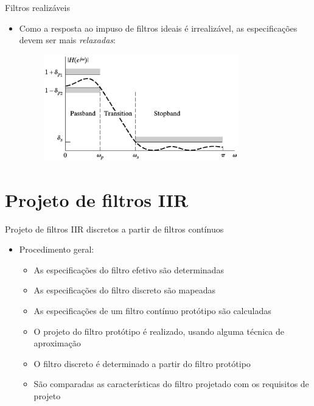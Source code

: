 %
%
\begin{slide}{Filtros realizáveis}
\begin{itemize}
   \item Como a resposta ao impuso de filtros ideais é irrealizável, as especificações devem ser mais \emph{relaxadas}:
   \begin{figure}
	   \centering
	   \includegraphics[width = 0.8\textwidth]{figs/specifications.eps}
   \end{figure}
\end{itemize}
\end{slide}

\section{Projeto de filtros IIR} 
\begin{slide}{Projeto de filtros IIR discretos a partir de filtros contínuos}
	\begin{itemize}
		\item Procedimento geral:
			\begin{itemize}
				\item As especificações do filtro efetivo são determinadas	
				\item As especificações do filtro discreto são mapeadas
				\item As especificações de um filtro contínuo protótipo são calculadas
				\item O projeto do filtro protótipo é realizado, usando alguma técnica de aproximação
				\item O filtro discreto é determinado a partir do filtro protótipo
				\item São comparadas as características do filtro projetado com os requisitos de projeto
			\end{itemize}
	\end{itemize}
\end{slide}

